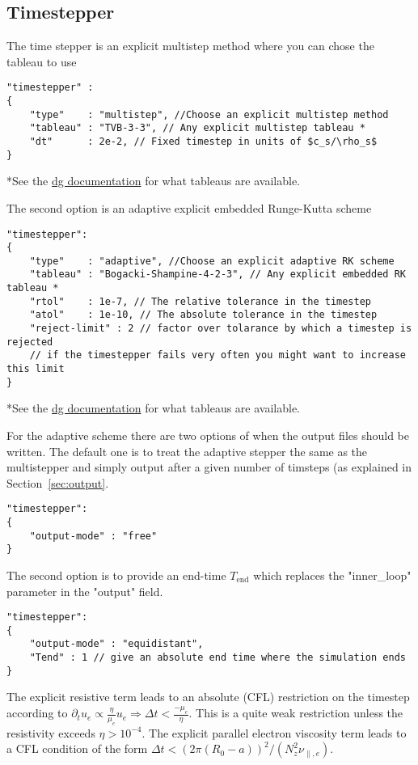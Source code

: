 \subsection{Timestepper}
The time stepper is an explicit multistep method where you can chose the
tableau to use
\begin{verbatim}
"timestepper" :
{
    "type"    : "multistep", //Choose an explicit multistep method
    "tableau" : "TVB-3-3", // Any explicit multistep tableau *
    "dt"      : 2e-2, // Fixed timestep in units of $c_s/\rho_s$
}
\end{verbatim}
*See the \href{https://feltor-dev.github.io/doc/dg/html/structdg_1_1_explicit_multistep.html}{dg documentation} for what tableaus are available.

The second option is an adaptive explicit embedded Runge-Kutta scheme
\begin{verbatim}
"timestepper":
{
    "type"    : "adaptive", //Choose an explicit adaptive RK scheme
    "tableau" : "Bogacki-Shampine-4-2-3", // Any explicit embedded RK tableau *
    "rtol"    : 1e-7, // The relative tolerance in the timestep
    "atol"    : 1e-10, // The absolute tolerance in the timestep
    "reject-limit" : 2 // factor over tolarance by which a timestep is rejected
    // if the timestepper fails very often you might want to increase this limit
}
\end{verbatim}
*See the \href{https://feltor-dev.github.io/doc/dg/html/structdg_1_1_e_r_k_step.html}{dg documentation} for what tableaus are available.

For the adaptive scheme there are two options of when the output files should be
written. The default one is to treat the adaptive stepper the same as the
multistepper and simply output after a given number of timsteps (as explained
    in Section~\ref{sec:output}.
\begin{verbatim}
"timestepper":
{
    "output-mode" : "free"
}
\end{verbatim}
The second option is to provide an end-time $T_{\text{end}}$ which replaces the
"inner\_loop" parameter in the "output" field.
\begin{verbatim}
"timestepper":
{
    "output-mode" : "equidistant",
    "Tend" : 1 // give an absolute end time where the simulation ends
}
\end{verbatim}

\begin{tcolorbox}[title=Note]
The explicit resistive term leads to an absolute (CFL) restriction
on the timestep according to $\partial_t u_e \propto \frac{\eta}{\mu_e} u_e \Rightarrow \Delta t < \frac{-\mu_e}{\eta}$. This is a quite weak restriction unless the resistivity exceeds $\eta > 10^{-4}$.
The explicit parallel electron viscosity term leads to a CFL condition of the
form $\Delta t < (2\pi (R_0 - a))^2/(N_z^2 \nu_{\parallel,e})$.
\end{tcolorbox}

